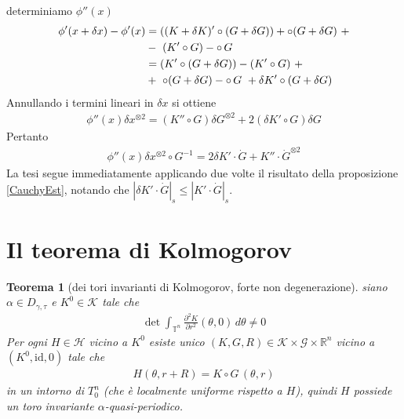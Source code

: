 \documentclass[twoside, 11pt]{amsbook}
\makeatletter
\newcommand{\0}{{(0)}}
\newcommand{\3}{{(3)}}
\theoremstyle{colonplain}
\newtheorem{thm}{Teorema}[chapter]
\theoremstyle{colondefinition}
\theoremstyle{colonremark}
\numberwithin{equation}{chapter}
\renewcommand{\proofname}{Dimostrazione}
\renewenvironment{proof}[1][\proofname]{\par
  \pushQED{\qed}%
  \normalfont \topsep6\p@\@plus6\p@\relax
  \trivlist
  \item[\hskip\labelsep\bfseries #1:]\ignorespaces
}{%
  \popQED\endtrivlist\@endpefalse
}
\makeatother
\begin{document}
\begin{proof} determiniamo $\phi''(x)$
\begin{align}
    \phi'(x + \delta x) - \phi'(x) &= ((K + \delta K)' \circ (G + \delta G)) + \circ (G + \delta G) \ + \notag \\
    &- \ (K' \circ G) - \circ \, G \notag \\
    &= (K' \circ (G + \delta G)) - (K' \circ G) \ + \notag \\
    &+ \ \circ (G + \delta G) - \circ \, G \ + \delta K ' \circ (G + \delta G)
\end{align}
Annullando i termini lineari in $\delta x$ si ottiene
\begin{align}
    \phi''(x)\delta x^{\otimes 2} = (K'' \circ G)\delta G^{\otimes 2} + 2(\delta K' \circ G)\delta G
\end{align}
Pertanto
\begin{align}
    \phi''(x)\delta x^{\otimes 2} \circ G^{-1} = 2\delta K' \cdot \dot{G} + K'' \cdot \dot{G}^{\otimes 2}
\end{align}
La tesi segue immediatamente applicando due volte il risultato della proposizione \ref{CauchyEst}, notando che $|\delta K' \cdot \dot{G}|_s \leq |K' \cdot \dot{G}|_s$. \end{proof}

\section{Il teorema di Kolmogorov}
\begin{thm}[dei tori invarianti di Kolmogorov, forte non degenerazione]\label{KolmThmStrongNonDeg} siano $\alpha \in D_{\gamma, \tau}$ e $K^0 \in \mathcal{K}$ tale che
\begin{align}
    \det \int_{\mathbb{T}^n} \frac{\partial^2 K}{\partial r^2}(\theta, 0) \, d\theta \neq 0 
\end{align}
Per ogni $H \in \mathcal{H}$ vicino a $K^0$ esiste unico $(K, G, R) \in \mathcal{K} \times \mathcal{G} \times \mathbb{R}^n$ vicino a $(K^0, \mathrm{id}, 0)$ tale che
\begin{align}
    H(\theta, r + R) = K \circ G \, (\theta, r) 
\end{align}
in un intorno di $T^n_0$ (che è localmente uniforme rispetto a $H$), quindi $H$ possiede un toro invariante $\alpha$-quasi-periodico.
\end{thm}
\end{document}
